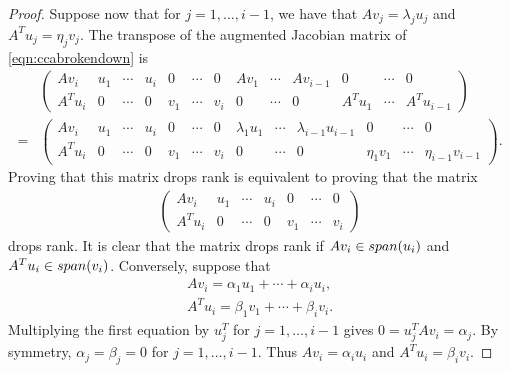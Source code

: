 \documentclass[10pt,a4paper]{amsart}
\begin{document}
\begin{proof}
    Suppose now that for $j = 1, \ldots, i - 1$, we have that $Av_j = \lambda_j u_j$ and $A^T u_j = \eta_j v_j$. 
    The transpose of the augmented Jacobian matrix of \eqref{eqn:ccabrokendown} is 
    \begin{align*}
    &\left (
     \begin{array}{ccccccccccccccc}
            Av_i & u_1 & \cdots & u_i & 0 & \cdots & 0 & Av_1 & \cdots & Av_{i-1}& 0 & \cdots & 0\\
            A^Tu_i & 0 & \cdots & 0 & v_1 & \cdots & v_i & 0 & \cdots & 0 & A^Tu_1 & \cdots & A^Tu_{i-1}
        \end{array}
        \right)\\
        = &   \left (
     \begin{array}{ccccccccccccccc}
            Av_i & u_1 & \cdots & u_i & 0 & \cdots & 0 & \lambda_1 u_1 & \cdots & \lambda_{i-1}u_{i-1}& 0 & \cdots & 0\\
            A^Tu_i & 0 & \cdots & 0 & v_1 & \cdots & v_i & 0 & \cdots & 0 & \eta_1v_1 & \cdots & \eta_{i-1}v_{i-1}
        \end{array}
        \right).
     \end{align*}
    Proving that this matrix drops rank is equivalent to proving that the matrix
    \begin{align*}
         \begin{pmatrix}
            Av_i  & u_1 & \cdots & u_i & 0 & \cdots & 0\\
            A^T u_i & 0 & \cdots & 0 & v_1 & \cdots & v_i
            \end{pmatrix}
    \end{align*}
    drops rank. 
    It is clear that the matrix drops rank if $Av_i \in {\rm span}(u_i)$ and $A^Tu_i \in {\rm span}(v_i)$.
    Conversely, suppose that
    \begin{align*}
        Av_i = \alpha_1 u_1 + \cdots + \alpha_i u_i,\\
        A^T u_i = \beta_1 v_1 + \cdots + \beta_i v_i.
    \end{align*}
    Multiplying the first equation by $u_j^T$ for $j = 1, \ldots, i-1$ gives $0 = u_j^T A v_i = \alpha_j$. 
    By symmetry, $\alpha_j = \beta_j = 0$ for $j =1, \ldots, i-1$. 
    Thus $Av_i = \alpha_i u_i$ and $A^T u_i = \beta_i v_i$. 
\end{proof}
\end{document}
